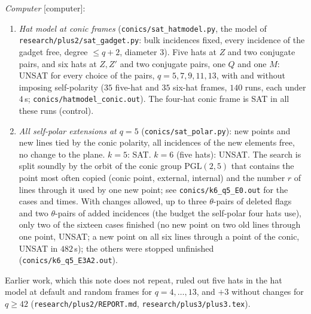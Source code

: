 \documentclass[11pt]{amsart}
\theoremstyle{definition}
\theoremstyle{remark}
\newcommand{\status}[1]{\textup{[#1]}}
\begin{document}
\emph{Computer} \status{computer}:
\begin{enumerate}[label=(\roman*)]
\item \emph{Hat model at conic frames} (\texttt{conics/sat\_hatmodel.py}, the model of
\texttt{research/plus2/sat\_gadget.py}: bulk incidences fixed, every incidence of the gadget free, degree $\le q+2$,
diameter $3$). Five hats at $Z$ and two conjugate pairs, and six hats at $Z,Z'$ and two conjugate pairs, one $Q$ and
one $M$: UNSAT for every choice of the pairs, $q=5,7,9,11,13$, with and without imposing self-polarity
($35$ five-hat and $35$ six-hat frames, $140$ runs, each under $4$\,s; \texttt{conics/hatmodel\_conic.out}). The
four-hat conic frame is SAT in all these runs (control).
\item \emph{All self-polar extensions at $q=5$} (\texttt{conics/sat\_polar.py}): new points and new lines tied by the
conic polarity, all incidences of the new elements free, no change to the plane. $k=5$: SAT. $k=6$ (five hats):
UNSAT. The search is split soundly by the orbit of the conic group $\mathrm{PGL}(2,5)$ that contains the point most
often copied (conic point, external, internal) and the number $r$ of lines through it used by one new point;
see \texttt{conics/k6\_q5\_E0.out} for the cases and times. With changes allowed, up to three $\theta$-pairs of deleted flags and two
$\theta$-pairs of added incidences (the budget the self-polar four hats use), only two of the sixteen cases finished
(no new point on two old lines through one point, UNSAT; a new point on all six lines through a point of the conic,
UNSAT in $482$\,s); the others were stopped unfinished (\texttt{conics/k6\_q5\_E3A2.out}).
\end{enumerate}
Earlier work, which this note does not repeat, ruled out five hats in the hat model at default and random frames
for $q=4,\dots,13$, and $+3$ without changes for $q\ge42$ (\texttt{research/plus2/REPORT.md},
\texttt{research/plus3/plus3.tex}).
\end{document}
